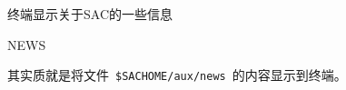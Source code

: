 \label{cmd:news}

终端显示关于SAC的一些信息

\begin{SACSTX}
NEWS
\end{SACSTX}

其实质就是将文件~\lstinline{$SACHOME/aux/news}~的内容显示到终端。
